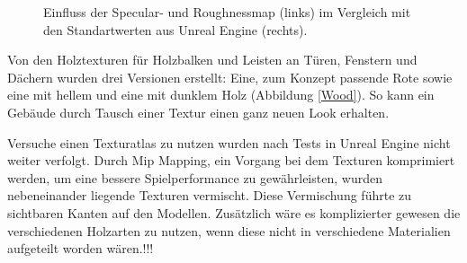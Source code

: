 \begin{figure}[H]
\centering
  \caption{Einfluss der Specular- und Roughnessmap (links) im Vergleich mit den Standartwerten aus Unreal Engine (rechts).}
	\label{specroughvs}
\end{figure}
\vspace{-10.5pt}
Von den Holztexturen für Holzbalken und Leisten an Türen, Fenstern und Dächern wurden drei Versionen erstellt: Eine, zum Konzept passende Rote sowie eine mit hellem und eine mit dunklem Holz (Abbildung \ref{Wood}). So kann ein Gebäude durch Tausch einer Textur einen ganz neuen Look erhalten.
\par
Versuche einen Texturatlas zu nutzen wurden nach Tests in Unreal Engine nicht weiter verfolgt. Durch Mip Mapping, ein Vorgang bei dem Texturen komprimiert werden, um eine bessere Spielperformance zu gewährleisten, wurden nebeneinander liegende Texturen vermischt. Diese Vermischung führte zu sichtbaren Kanten auf den Modellen. Zusätzlich wäre es komplizierter gewesen die verschiedenen Holzarten zu nutzen, wenn diese nicht in verschiedene Materialien aufgeteilt worden wären.!!!
